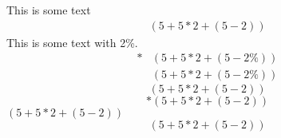 This is some text
\begin{align}\label{equ1(good)}%
\left(5+5*2+\left(5-2\right)\right)%
\end{align}
This is some text with 2\%.
\begin{align}*
&\left(5+5*2+\left(5-2\%\right)\right)\\
&\left(5+5*2+\left(5-2\%\right)\right)
\end{align}
\begin{equation}\label{equ2(good)}
\left(5+5*2+\left(5-2\right)\right)%
\end{equation}
\begin{equation}*
\left(5+5*2+\left(5-2\right)\right)
\end{equation}
\(\left(5+5*2+\left(5-2\right)\right)\)
\[\left(5+5*2+\left(5-2\right)\right)\]
